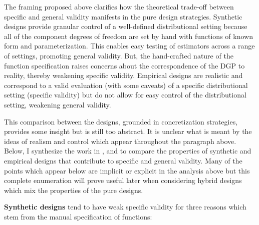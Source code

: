 \documentclass[../main.tex]{subfiles}
\begin{document}
\vspace{\baselineskip}
The framing proposed above clarifies how the theoretical trade-off between specific and general validity manifests in the pure design strategies. Synthetic designs provide granular control of a well-defined distributional setting because all of the component degrees of freedom are set by hand with functions of known form and parameterization. This enables easy testing of estimators across a range of settings, promoting general validity. But, the hand-crafted nature of the function specification raises concerns about the correspondence of the DGP to reality, thereby weakening specific validity. Empirical designs are realistic and correspond to a valid evaluation (with some caveats) of a specific distributional setting (specific validity) but do not allow for easy control of the distributional setting, weakening general validity.\par


\vspace{\baselineskip}
This comparison between the designs, grounded in concretization strategies, provides some insight but is still too abstract. It is unclear what is meant by the ideas of realism and control which appear throughout the paragraph above. Below, I synthesize the work in \cite{Paxton2001MonteImplementation}, \cite{Huber2013TheScore} and \cite{Dorie2019Automated1} to compare the properties of synthetic and empirical designs that contribute to specific and general validity. Many of the points which appear below are implicit or explicit in the analysis above but this complete enumeration will prove useful later when considering hybrid designs which mix the properties of the pure designs.\par


\vspace{\baselineskip}
\textbf{Synthetic designs} tend to have weak specific validity for three reasons which stem from the manual specification of functions:\par
\end{document}
